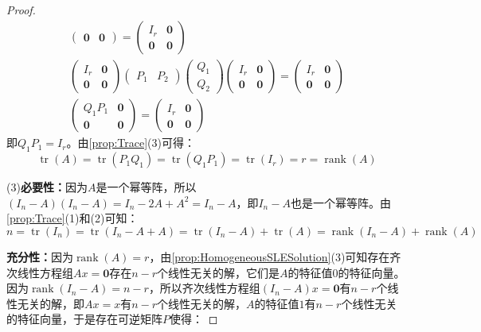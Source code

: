 \begin{proof}
\begin{gather*}
\begin{pmatrix}
			\mathbf{0} & \mathbf{0}
		\end{pmatrix}=
		\begin{pmatrix}
			I_r & \mathbf{0} \\
			\mathbf{0} & \mathbf{0}
		\end{pmatrix} \\
		\begin{pmatrix}
			I_r & \mathbf{0} \\
			\mathbf{0} & \mathbf{0}
		\end{pmatrix}
		\begin{pmatrix}
			P_1 & P_2
		\end{pmatrix}
		\begin{pmatrix}
			Q_1 \\
			Q_2
		\end{pmatrix}
		\begin{pmatrix}
			I_r & \mathbf{0} \\
			\mathbf{0} & \mathbf{0}
		\end{pmatrix}=
		\begin{pmatrix}
			I_r & \mathbf{0} \\
			\mathbf{0} & \mathbf{0}
		\end{pmatrix} \\
		\begin{pmatrix}
			Q_1P_1 & \mathbf{0} \\
			\mathbf{0} & \mathbf{0}
		\end{pmatrix}
		=
		\begin{pmatrix}
			I_r & \mathbf{0} \\
			\mathbf{0} & \mathbf{0}
		\end{pmatrix}
	\end{gather*}
	即$Q_1P_1=I_r$。由\cref{prop:Trace}(3)可得：
	\begin{equation*}
		\operatorname{tr}(A)=\operatorname{tr}(P_1Q_1)=\operatorname{tr}(Q_1P_1)=\operatorname{tr}(I_r)=r=\operatorname{rank}(A)
	\end{equation*}\par
	(3)\textbf{必要性：}因为$A$是一个幂等阵，所以$(I_n-A)(I_n-A)=I_n-2A+A^2=I_n-A$，即$I_n-A$也是一个幂等阵。由\cref{prop:Trace}(1)和(2)可知：
	\begin{equation*}
		n=\operatorname{tr}(I_n)=\operatorname{tr}(I_n-A+A)=\operatorname{tr}(I_n-A)+\operatorname{tr}(A)=\operatorname{rank}(I_n-A)+\operatorname{rank}(A)
	\end{equation*}\par
	\textbf{充分性：}因为$\operatorname{rank}(A)=r$，由\cref{prop:HomogeneousSLESolution}(3)可知存在齐次线性方程组$Ax=\mathbf{0}$存在$n-r$个线性无关的解，它们是$A$的特征值$0$的特征向量。因为$\operatorname{rank}(I_n-A)=n-r$，所以齐次线性方程组$(I_n-A)x=\mathbf{0}$有$n-r$个线性无关的解，即$Ax=x$有$n-r$个线性无关的解，$A$的特征值$1$有$n-r$个线性无关的特征向量，于是存在可逆矩阵$P$使得：

\end{proof}
